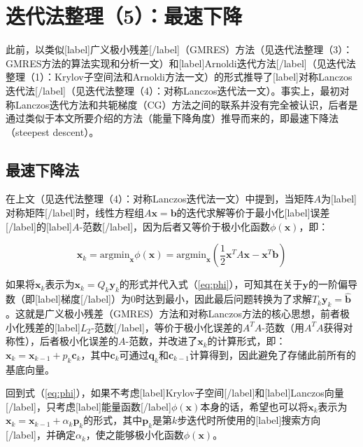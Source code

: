 \documentclass[UTF8,nofonts]{ctexart}
\begin{document}

\section*{迭代法整理（5）：最速下降}

此前，以类似[label]广义极小残差[/label]（GMRES）方法（见迭代法整理（3）：GMRES方法的算法实现和分析一文）和[label]Arnoldi迭代方法[/label]（见迭代法整理（1）：Krylov子空间法和Arnoldi方法一文）的形式推导了[label]对称Lanczos迭代法[/label]（见迭代法整理（4）：对称Lanczos迭代法一文）。事实上，最初对称Lanczos迭代方法和共轭梯度（CG）方法之间的联系并没有完全被认识，后者是通过类似于本文所要介绍的方法（能量下降角度）推导而来的，即最速下降法（steepest descent）。

\subsection*{最速下降法}

在上文（见迭代法整理（4）：对称Lanczos迭代法一文）中提到，当矩阵$A$为[label]对称矩阵[/label]时，线性方程组$A\boldsymbol{x}=\boldsymbol{b}$的迭代求解等价于最小化[label]误差[/label]的[label]$A$-范数[/label]，因为后者又等价于极小化函数$\phi(\boldsymbol{x})$，即：

\begin{equation}
	\label{eq:phi}
	\boldsymbol{x}_k =\text{argmin}_{\boldsymbol{x}}\phi(\boldsymbol{x})=\text{argmin}_{\boldsymbol{x}}\left( \frac{1}{2}\boldsymbol{x}^TA\boldsymbol{x}-\boldsymbol{x}^T\boldsymbol{b} \right)
\end{equation}

如果将$\boldsymbol{x}_k$表示为$\boldsymbol{x}_k=Q_k\boldsymbol{y}_k$的形式并代入式（\ref{eq:phi}），可知其在关于$\boldsymbol{y}$的一阶偏导数（即[label]梯度[/label]）为$0$时达到最小，因此最后问题转换为了求解$T_{k}\boldsymbol{y}_k=\hat{\boldsymbol{b}}$。这就是广义极小残差（GMRES）方法和对称Lanczos方法的核心思想，前者极小化残差的[label]$L_2$-范数[/label]，等价于极小化误差的$A^TA$-范数（用$A^TA$获得对称性），后者极小化误差的$A$-范数，并改进了$\boldsymbol{x}_k$的计算形式，即：$\boldsymbol{x}_k=\boldsymbol{x}_{k-1}+p_k\boldsymbol{c}_k$，其中$\boldsymbol{c}_k$可通过$\boldsymbol{q}_k$和$\boldsymbol{c}_{k-1}$计算得到，因此避免了存储此前所有的基底向量。

回到式（\ref{eq:phi}），如果不考虑[label]Krylov子空间[/label]和[label]Lanczos向量[/label]，只考虑[label]能量函数[/label]$\phi(\boldsymbol{x})$本身的话，希望也可以将$\boldsymbol{x}_k$表示为$\boldsymbol{x}_{k}=\boldsymbol{x}_{k-1}+\alpha_k\boldsymbol{p}_k$的形式，其中$\boldsymbol{p}_k$是第$k$步迭代时所使用的[label]搜索方向[/label]，并确定$\alpha_k$，使之能够极小化函数$\phi(\boldsymbol{x})$。
\end{document}
